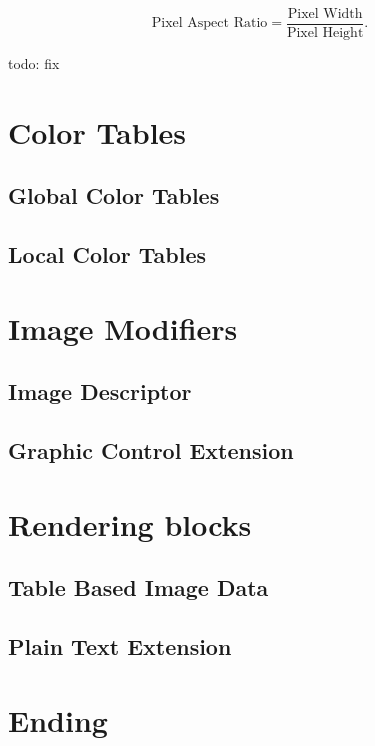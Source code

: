 \begin{refsection}
  \begin{equation*}
    \textrm{Pixel Aspect Ratio} = \frac{\text{Pixel Width}}{\text{Pixel Height}}.
  \end{equation*}

  todo: fix

  \section{Color Tables}

  \subsection{Global Color Tables}

  \subsection{Local Color Tables}

  \section{Image Modifiers}

  \subsection{Image Descriptor}

  \subsection{Graphic Control Extension}

  \section{Rendering blocks}

  \subsection{Table Based Image Data}

  \subsection{Plain Text Extension}

  \section{Ending}


\end{refsection}

